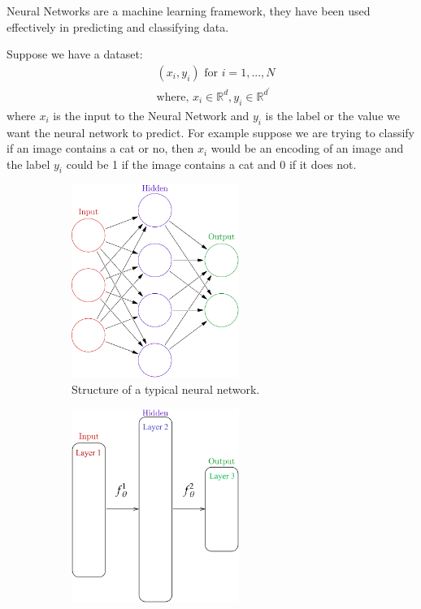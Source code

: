\documentclass[dissertation.tex]{subfiles}
\begin{document}
Neural Networks are a machine learning framework, they have been used
effectively in predicting and classifying data.

Suppose we have a dataset:
\begin{align*}
  &(x_i, y_i) \text{ for } i = 1,...,N \\
  &\text{where, } x_i \in \mathbb{R}^d, y_i \in \mathbb{R}^{d^\prime}
\end{align*}
where $x_i$ is the input to the Neural Network and $y_i$ is the label or the
value we want the neural network to predict. For example suppose we are trying
to classify if an image contains a cat or no, then $x_i$ would be an encoding of
an image and the label $y_i$ could be 1 if the image contains a cat and 0 if it
does not.

\begin{figure}[H]
  \centering
  \begin{subfigure}[t]{0.49\textwidth}
    \centering
    \includegraphics[width=0.6\textwidth]{figs/neural_network.png}
    \caption{
      Structure of a typical neural network.
    }
    \label{fig:nnOriginal}
  \end{subfigure}
  \hfill
  \begin{subfigure}[t]{0.49\textwidth}
    \centering
    \includegraphics[width=0.6\textwidth]{figs/neural_network_abstraction.png}

\end{subfigure}
\end{figure}
\end{document}
